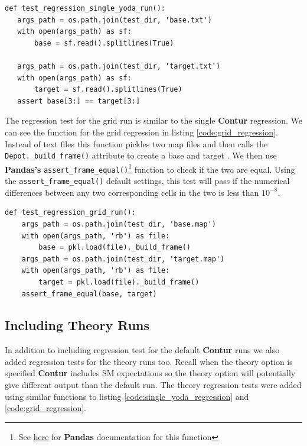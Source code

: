 \begin{code}
\label{code:single_yoda_regression}
\begin{verbatim}
def test_regression_single_yoda_run():
   args_path = os.path.join(test_dir, 'base.txt')
   with open(args_path) as sf:
       base = sf.read().splitlines(True)
    
   args_path = os.path.join(test_dir, 'target.txt')
   with open(args_path) as sf:
       target = sf.read().splitlines(True)
   assert base[3:] == target[3:]
\end{verbatim}
\end{code}

The regression test for the grid run is similar to the single \textbf{Contur} regression. We can see the function for the grid regression in listing \ref{code:grid_regression}. Instead of text files this function pickles two map files and then calls the \texttt{Depot.\_build\_frame()} attribute to create a base and target . We then use \textbf{Pandas's} \texttt{assert\_frame\_equal()}\footnote{See \href{https://pandas.pydata.org/docs/reference/api/pandas.testing.assert_frame_equal.html}{here} for \textbf{Pandas} documentation for this function} function to check if the two  are equal. Using the \texttt{assert\_frame\_equal()} default settings, this test will pass if the numerical differences between any two corresponding cells in the two  is less than $10^{-8}$.

\begin{code}
\label{code:grid_regression}
\begin{verbatim}
def test_regression_grid_run():
    args_path = os.path.join(test_dir, 'base.map')
    with open(args_path, 'rb') as file:
        base = pkl.load(file)._build_frame()
    args_path = os.path.join(test_dir, 'target.map')
    with open(args_path, 'rb') as file:
        target = pkl.load(file)._build_frame()
    assert_frame_equal(base, target)
\end{verbatim}
\end{code}

\subsection{Including Theory Runs}
In addition to including regression test for the default \textbf{Contur} runs we also added regression tests for the theory runs too. Recall when the theory option is specified \textbf{Contur} includes SM expectations so the theory option will potentially give different output than the default run. The theory regression tests were added using similar functions to listing \ref{code:single_yoda_regression} and \ref{code:grid_regression}.


